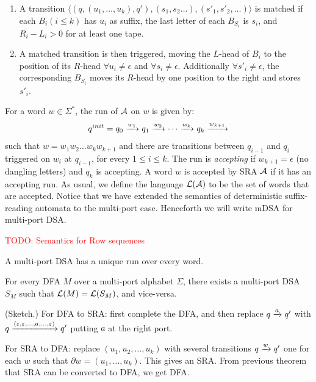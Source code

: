 \begin{enumerate}
\item A transition $\langle (q, (u_1, \dots, u_k), q') , (s_1, s_2 \dots), (s'_1,s'_2,\dots) \rangle$ is matched if each $B_i (i\le k)$ has $u_i$ as suffix, the last letter of each $B_{S_i}$ is $s_i$, and $R_i-L_i>0$ for at least one tape.

\item A matched transition is then triggered, moving  the $L$-head of $B_i$ to the position of its $R$-head $\forall u_i \ne \epsilon$ and $\forall s_i \ne \epsilon$. Additionally $\forall s'_i \ne \epsilon$, the corresponding $B_{S_i}$ moves its $R$-head by one position to the right and stores $s'_i$.
\end{enumerate}


 For a word $w \in \Sigma^*$, the run of $\mathcal{A}$ on $w$ is given by:
 \begin{align*}
   q^{init} = q_0 \xrightarrow{w_1} q_1 \xrightarrow{w_2} \cdots \xrightarrow{w_{k}} q_k \xrightarrow{w_{k+1}}
 \end{align*}
 such that $w = w_1 w_2 \dots w_kw_{k+1}$ and there are transitions
 between $q_{i-1}$ and $q_i$ triggered on $w_i$ at $q_{i-1}$, for
 every $1 \le i \le k$. The run is \emph{accepting} if
 $w_{k+1} = \epsilon$ (no dangling letters) and $q_k$ is accepting. A
 word $w$ is accepted by SRA $\mathcal{A}$ if it has an accepting run. As
 usual, we define the language $\mathcal{L}(\mathcal{A})$ to be the set of words that
 are accepted. Notice that we have extended the semantics of
 deterministic suffix-reading automata to the multi-port
 case. Henceforth we will write mDSA for multi-port DSA.%

\textcolor{red}{TODO: Semantics for Row sequences}

\begin{lemma}
 A multi-port DSA has a unique run over every word.
\end{lemma}%

\begin{theorem}
 For every DFA $M$ over a multi-port alphabet $\Sigma$, there exists
 a multi-port DSA $S_M$ such that $\mathcal{L}(M) = \mathcal{L}(S_M)$, and
 vice-versa.
\end{theorem}
\begin{IEEEproof} (Sketch.) For DFA to SRA: first complete the DFA, and
 then replace $q \xrightarrow{a} q'$ with
 $q \xrightarrow{(\varepsilon, \varepsilon, \dots, a, \dots, \varepsilon)} q'$ putting $a$ at the right
 port.%

 For SRA to DFA: replace $(u_1, u_2, \dots, u_k)$ with several
 transitions $q \xrightarrow{w} q'$ one for each $w$ such that
 $\partial w = (u_1, \dots, u_k)$. This gives an SRA. From previous
 theorem that SRA can be converted to DFA, we get DFA.%

\end{IEEEproof}%






